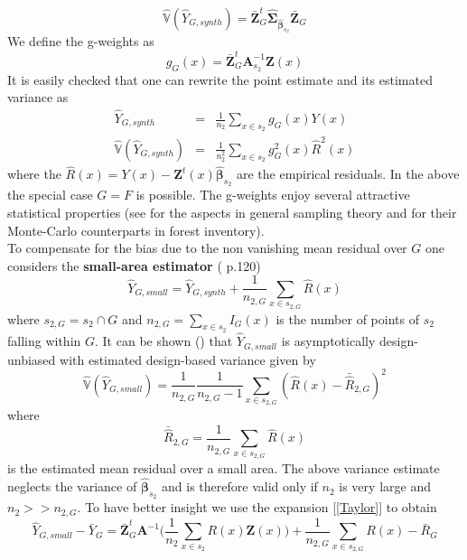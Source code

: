 \documentclass[a4paper,12pt,leqno, titlepage]{article}
\newcommand{\VAR}{\mathbb{V}}
\begin{document}
\begin{equation}\label{synthetic2}
\hat{\VAR}(\hat{Y}_{G,synth})=\bar{\pmb{Z}}_G^t\hat{\pmb{\Sigma}}_{\hat{\pmb{\beta}}_{s_2}}\bar{\pmb{Z}}_G
\end{equation}
We define the g-weights as
\begin{equation}\label{gweights1}
g_G(x)=\bar{\pmb{Z}}_G^t\pmb{A}^{-1}_{s_2}\pmb{Z}(x)
\end{equation}
It is easily checked that one can rewrite the point estimate and its estimated variance as
\begin{eqnarray}\label{gweights2}
\hat{Y}_{G,synth}&=&\frac{1}{n_2}\sum_{x\in{s_2}}g_G(x)Y(x) \nonumber\\
\hat{\VAR}(\hat{Y}_{G,synth})&=&\frac{1}{n^2_2}\sum_{x\in{s_2}}g^2_G(x)\hat{R}^2(x)
\end{eqnarray}
where the $\hat{R}(x)=Y(x)-\pmb{Z}^t(x)\hat{\pmb{\beta}}_{s_2}$ are the empirical residuals.
In the above the special case $G=F$ is possible. The g-weights enjoy  several attractive statistical properties (see \cite{sarndal} for the aspects in general sampling theory and \cite{mandallaz} for their Monte-Carlo counterparts in forest inventory).\\
To compensate for the bias due to the non vanishing mean residual over $G$ one considers the \textbf{small-area estimator} (\cite{mandallaz} p.120)
\begin{equation}\label{smallareaest}
\hat{Y}_{G,small}=\hat{Y}_{G,synth}+
\frac{1}{n_{2,G}}\sum_{x\in{s_{2,G}}}\hat{R}(x)
\end{equation}
\noindent where $s_{2,G}=s_2\cap G$ and $n_{2,G}=\sum_{x\in{s_2}}I_G(x)$ is the number of
points of $s_2$ falling within $G$. It can be shown (\cite{mandallaz}) that $\hat{Y}_{G,small}$ is asymptotically design-unbiased with estimated design-based variance given by
\begin{equation}\label{smallareadesignvariance1}
\hat{\VAR}(\hat{Y}_{G,small})=
\frac{1}{n_{2,G}}\frac{1}{n_{2,G}-1}\sum_{x\in{s_{2,G}}}(\hat{R}(x)-\bar{\hat{R}}_{2,G})^2
\end{equation}
\noindent where
$$\bar{\hat{R}}_{2,G}=\frac{1}{n_{2,G}}\sum_{x\in{s_{2,G}}}\hat{R}(x)$$
is the estimated mean residual over a small area. The above variance estimate neglects the variance of $\hat{\pmb{\beta}}_{s_2}$ and is therefore valid only if $n_2$ is very large and $n_2>> n_{2,G}$. To have better insight we use the expansion [\ref{Taylor}] to obtain
\begin{equation}\label{smallexp1}
\hat{Y}_{G,small}-\bar{Y}_G=
\bar{\pmb{Z}}^t_G\pmb{A}^{-1}\Big(\frac{1}{n_2}\sum_{x\in{s_2}}R(x)\pmb{Z}(x)\Big)
+ \frac{1}{n_{2,G}}\sum_{x\in{s_{2,G}}}R(x)-\bar{R}_G
\end{equation}
\end{document}
